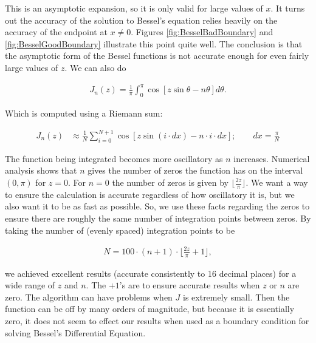 \documentclass[onecolumn, groupedaddress, 10pt]{revtex4-1}
\begin{document}
This is an asymptotic expansion, so it is only valid for large values of $x$.  It turns out the accuracy of the solution to Bessel's equation relies heavily on the accuracy of the endpoint at $x \neq 0$.  Figures \ref{fig:BesselBadBoundary} and \ref{fig:BesselGoodBoundary} illustrate this point quite well.  The conclusion is that the asymptotic form of the Bessel functions is not accurate enough for even fairly large values of $z$.  We can also do

\begin{align}
J_n (z) = \frac{1}{\pi} \int_{0}^{\pi} \cos \left[ z \sin \theta - n \theta \right] d \theta.
\end{align}

Which is computed using a Riemann sum:

\begin{align}
\label{eqn:numericalIntegralBessel}
J_n (z) &\approx \frac{1}{N} \sum_{i=0}^{N+1} \cos \left[ z \sin(i \cdot dx) - n \cdot i \cdot dx \right];
\qquad dx = \frac{\pi}{N}
\end{align}

The function being integrated becomes more oscillatory as $n$ increases.  Numerical analysis shows that $n$ gives the number of zeros the function has  on the interval $(0,\pi)$ for $z=0$.  For $n=0$ the number of zeros is given by $\lfloor \frac{2z}{\pi} \rfloor$.  We want a way to ensure the calculation is accurate regardless of how oscillatory it is, but we also want it to be as fast as possible. So, we use these facts regarding the zeros to ensure there are roughly the same number of integration points between zeros.  By taking the number of (evenly spaced) integration points to be

\begin{align}
\label{eqn:dynamicIntegrationPoints}
N = 100 \cdot (n + 1) \cdot \Bigg \lfloor \frac{2z}{\pi} + 1  \Bigg \rfloor,
\end{align}

we achieved excellent results (accurate consistently to 16 decimal places) for a wide range of $z$ and $n$.  The $+1$'s are to ensure accurate results when $z$ or $n$ are zero.  The algorithm can have problems when $J$ is extremely small.  Then the function can be off by many orders of magnitude, but because it is essentially zero, it does not seem to effect our results when used as a boundary condition for solving Bessel's Differential Equation.
\end{document}
